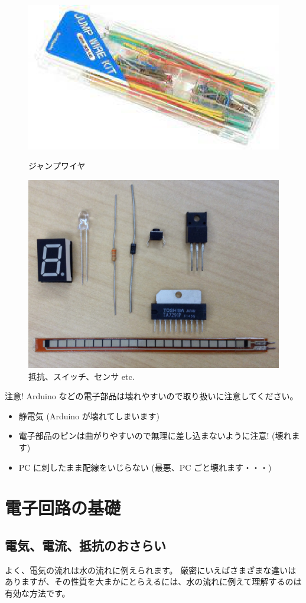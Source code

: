 \documentclass[11pt,a4paper]{jarticle}
\begin{document}
\begin{figure}[h!]
 \begin{minipage}{0.5\columnwidth}
  \centering
  \includegraphics[height=0.4\columnwidth]{jumpwire.eps}
  \caption{ジャンプワイヤ}
 \end{minipage}
 \begin{minipage}{0.5\columnwidth}
  \centering
  \includegraphics[height=0.4\columnwidth]{parts.eps}
  \caption{抵抗、スイッチ、センサ etc.}
 \end{minipage}
\end{figure}

\begin{itembox}{注意!}
 Arduino などの電子部品は壊れやすいので取り扱いに注意してください。
 \begin{itemize}
  \item 静電気 (Arduino が壊れてしまいます)
  \item 電子部品のピンは曲がりやすいので無理に差し込まないように注意! (壊れます)
  \item PC に刺したまま配線をいじらない (最悪、PC ごと壊れます・・・)
 \end{itemize}
\end{itembox}

\section{電子回路の基礎}

\subsection*{電気、電流、抵抗のおさらい}
よく、電気の流れは水の流れに例えられます。
厳密にいえばさまざまな違いはありますが、その性質を大まかにとらえるには、水の流れに例えて理解するのは有効な方法です。
\end{document}
